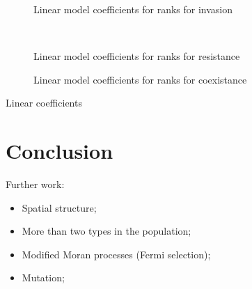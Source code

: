\documentclass{article}
\begin{document}
\begin{table}[!hbtp]
    \centering
    \begin{subfigure}{.5\textwidth}
        \centering
        
        \caption{Linear model coefficients for ranks for invasion}
        \label{tbl:linear_coeficients_invade}
    \end{subfigure}%
    ~
    \begin{subfigure}{.5\textwidth}
        \centering
        
        \caption{Linear model coefficients for ranks for resistance}
        \label{tbl:linear_coeficients_resist}
    \end{subfigure}

    \begin{subfigure}{.5\textwidth}
        \centering
        
        \caption{Linear model coefficients for ranks for coexistance}
        \label{tbl:linear_coeficients_coexist}
    \end{subfigure}
    \caption{Linear coefficients}
\end{table}




\section{Conclusion}\label{sec:conclusion}


Further work:

\begin{itemize}
    \item Spatial structure;
    \item More than two types in the population;
    \item Modified Moran processes (Fermi selection);
    \item Mutation;
\end{itemize}
\end{document}
